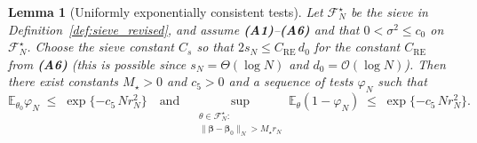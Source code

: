\documentclass[11pt]{article}
\theoremstyle{plain}
\newtheorem{lemma}{Lemma}
\theoremstyle{definition}
\theoremstyle{plain}
\begin{document}


\begin{lemma}[Uniformly exponentially consistent tests]\label{lem:tests}
Let $\mathcal F_N^\star$ be the sieve in Definition~\ref{def:sieve_revised}, and assume \textbf{(A1)}–\textbf{(A6)} and that $0<\sigma^2\le c_0$ on $\mathcal F_N^\star$.
Choose the sieve constant $C_s$ so that $2s_N\le C_{\mathrm{RE}}\,d_0$ for the constant $C_{\mathrm{RE}}$ from \textbf{(A6)} (this is possible since $s_N=\Theta(\log N)$ and $d_0=\mathcal{O}(\log N)$).
Then there exist constants $M_\star>0$ and $c_5>0$ and a sequence of tests $\varphi_N$ such that
\[
\mathbb{E}_{\theta_0}\varphi_N \;\le\; \exp\{-c_5\,N r_N^2\}
\quad \text{and} \quad
\sup_{\substack{\theta\in\mathcal F_N^\star:\\ \|\bm\beta-\bm\beta_0\|_N> M_\star r_N}}
\mathbb{E}_{\theta}(1-\varphi_N) \;\le\; \exp\{-c_5\,N r_N^2\}.
\]
\end{lemma}
\end{document}
